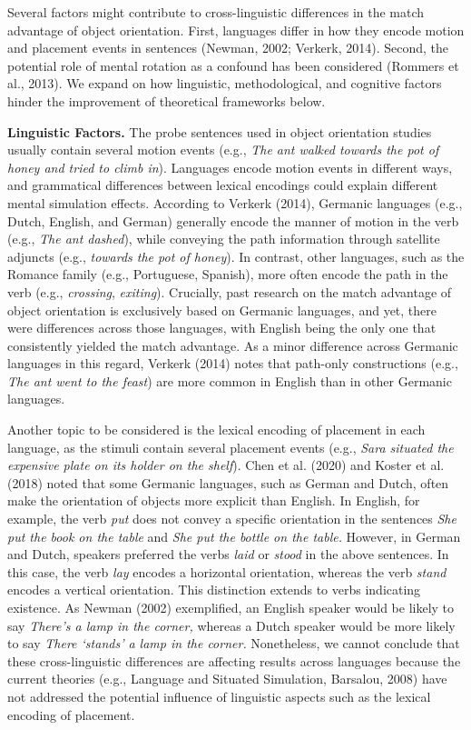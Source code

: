 \documentclass[
  man,floatsintext]{apa7}
\begin{document}
Several factors might contribute to cross-linguistic differences in the
match advantage of object orientation. First, languages differ in how
they encode motion and placement events in sentences
(Newman, 2002; Verkerk, 2014). Second, the
potential role of mental rotation as a confound has been considered
(Rommers et al., 2013). We expand on how linguistic,
methodological, and cognitive factors hinder the improvement of
theoretical frameworks below.

\textbf{Linguistic Factors.} The probe sentences used in object orientation
studies usually contain several motion events (e.g., \emph{The ant walked
towards the pot of honey and tried to climb in}). Languages encode
motion events in different ways, and grammatical differences between
lexical encodings could explain different mental simulation effects.
According to Verkerk (2014), Germanic languages (e.g., Dutch, English, and
German) generally encode the manner of motion in the verb (e.g., \emph{The
ant dashed}), while conveying the path information through satellite
adjuncts (e.g., \emph{towards the pot of honey}). In contrast, other
languages, such as the Romance family (e.g., Portuguese, Spanish), more
often encode the path in the verb (e.g., \emph{crossing}, \emph{exiting}).
Crucially, past research on the match advantage of object orientation is
exclusively based on Germanic languages, and yet, there were differences
across those languages, with English being the only one that
consistently yielded the match advantage. As a minor difference across
Germanic languages in this regard, Verkerk (2014) notes that path-only
constructions (e.g., \emph{The ant went to the feast}) are more common in
English than in other Germanic languages.

Another topic to be considered is the lexical encoding of placement in
each language, as the stimuli contain several placement events (e.g.,
\emph{Sara situated the expensive plate on its holder on the shelf}).
Chen et al. (2020) and Koster et al. (2018) noted that
some Germanic languages, such as German and Dutch, often make the
orientation of objects more explicit than English. In English, for
example, the verb \emph{put} does not convey a specific orientation in the
sentences \emph{She put the book on the table} and \emph{She put the bottle on the
table.} However, in German and Dutch, speakers preferred the verbs
\emph{laid} or \emph{stood} in the above sentences. In this case, the verb \emph{lay}
encodes a horizontal orientation, whereas the verb \emph{stand} encodes a
vertical orientation. This distinction extends to verbs indicating
existence. As Newman (2002) exemplified, an
English speaker would be likely to say \emph{There's a lamp in the corner,}
whereas a Dutch speaker would be more likely to say \emph{There `stands' a
lamp in the corner.} Nonetheless, we cannot conclude that these
cross-linguistic differences are affecting results across languages
because the current theories (e.g., Language and Situated Simulation, Barsalou, 2008) have not addressed the potential influence of
linguistic aspects such as the lexical encoding of placement.
\end{document}
